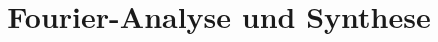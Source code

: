 

\subject{Versuch 351}
\title{Fourier-Analyse und Synthese}


    \maketitle
    \thispagestyle{empty}
    \tableofcontents
    \newpage
    
    
    
    
    
    \printbibliography{}

